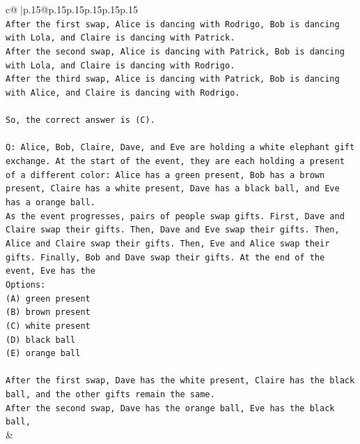 \documentclass{article}
\begin{document}
{\begin{supertabular}{c@{$\;$}|p{.15\linewidth}@{}p{.15\linewidth}p{.15\linewidth}p{.15\linewidth}p{.15\linewidth}p{.15\linewidth}}
{{{\\ 
\texttt{After the first swap, Alice is dancing with Rodrigo, Bob is dancing with Lola, and Claire is dancing with Patrick. } \\
\texttt{After the second swap, Alice is dancing with Patrick, Bob is dancing with Lola, and Claire is dancing with Rodrigo. } \\
\texttt{After the third swap, Alice is dancing with Patrick, Bob is dancing with Alice, and Claire is dancing with Rodrigo.} \\
\\ 
\texttt{So, the correct answer is (C).} \\
\\ 
\texttt{Q: Alice, Bob, Claire, Dave, and Eve are holding a white elephant gift exchange. At the start of the event, they are each holding a present of a different color: Alice has a green present, Bob has a brown present, Claire has a white present, Dave has a black ball, and Eve has a orange ball.} \\
\texttt{As the event progresses, pairs of people swap gifts. First, Dave and Claire swap their gifts. Then, Dave and Eve swap their gifts. Then, Alice and Claire swap their gifts. Then, Eve and Alice swap their gifts. Finally, Bob and Dave swap their gifts. At the end of the event, Eve has the} \\
\texttt{Options:} \\
\texttt{(A) green present} \\
\texttt{(B) brown present} \\
\texttt{(C) white present} \\
\texttt{(D) black ball} \\
\texttt{(E) orange ball} \\
\\ 
\texttt{After the first swap, Dave has the white present, Claire has the black ball, and the other gifts remain the same. } \\
\texttt{After the second swap, Dave has the orange ball, Eve has the black ball,} \\
            }
        }
    }
    & \\ \\


\end{supertabular}}
\end{document}
